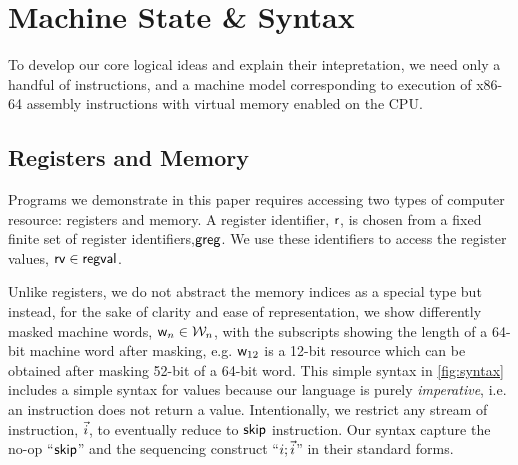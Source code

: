 \section{Machine State \& Syntax}
\label{sec:syntax}
To develop our core logical ideas and explain their intepretation, we need only a handful of instructions, and a machine model corresponding to execution of x86-64 assembly instructions with virtual memory enabled on the CPU.

\subsection{Registers and Memory}
Programs we demonstrate in this paper requires accessing two types of computer resource: registers and memory. A register identifier, $\mathsf{r}$, is chosen from a fixed finite set of register identifiers,$\mathsf{greg}$. We use these identifiers to access the register values, $\mathsf{rv} \in \mathsf{regval}$.



Unlike registers, we do not abstract the memory indices as a special type but instead, for the sake of clarity and ease of representation, we show differently masked machine words, $\mathsf{w}_n \in \mathcal{W}_n$, with the subscripts showing the length of a 64-bit machine word after masking, e.g. $\mathsf{w}_{12}$ is a 12-bit resource which can be obtained after masking 52-bit of a 64-bit word.
This simple syntax in \ref{fig:syntax} includes a simple syntax for values because our language is purely \textit{imperative}, i.e. an instruction does not return a value. Intentionally, we restrict any stream of instruction, $\vec{i}$, to eventually reduce to $\mathsf{skip}$ instruction. Our syntax capture the no-op ``$\mathsf{skip}$'' and the sequencing construct ``$i; \vec{i}$'' in their standard forms.
